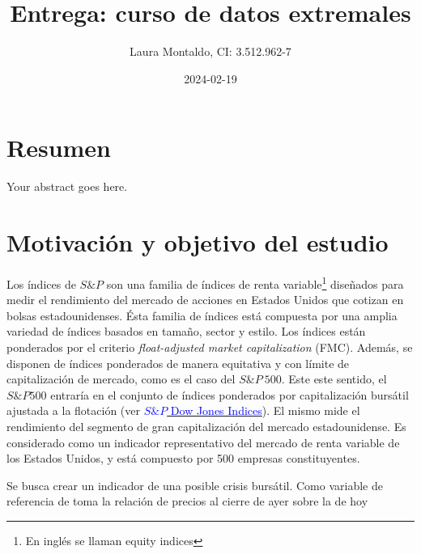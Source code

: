 \documentclass[
  12pt]{article}
\title{Entrega: curso de datos extremales}
\author{Laura Montaldo, CI: 3.512.962-7}
\date{2024-02-19}
\begin{document}
\maketitle

\newpage

\thispagestyle{empty}

\maketitle

\newpage

\tableofcontents

\newpage

\hypertarget{resumen}{%
\section{Resumen}\label{resumen}}

Your abstract goes here.

\newpage

\hypertarget{motivaciuxf3n-y-objetivo-del-estudio}{%
\section{Motivación y objetivo del
estudio}\label{motivaciuxf3n-y-objetivo-del-estudio}}

Los índices de \(S\&P\) son una familia de índices de renta
variable\footnote{En inglés se llaman equity indices} diseñados para
medir el rendimiento del mercado de acciones en Estados Unidos que
cotizan en bolsas estadounidenses. Ésta familia de índices está
compuesta por una amplia variedad de índices basados en tamaño, sector y
estilo. Los índices están ponderados por el criterio
\textit{float-adjusted market capitalization} (FMC). Además, se disponen
de índices ponderados de manera equitativa y con límite de
capitalización de mercado, como es el caso del \(S\&P\:500\). Este este
sentido, el \(S\&P 500\) entraría en el conjunto de índices ponderados
por capitalización bursátil ajustada a la flotación (ver
\href{http://www.overleaf.com}{\textcolor{blue}{$S\&P$ Dow Jones Indices}}).
El mismo mide el rendimiento del segmento de gran capitalización del
mercado estadounidense. Es considerado como un indicador representativo
del mercado de renta variable de los Estados Unidos, y está compuesto
por 500 empresas constituyentes.

Se busca crear un indicador de una posible crisis bursátil. Como
variable de referencia de toma la relación de precios al cierre de ayer
sobre la de hoy
\end{document}
